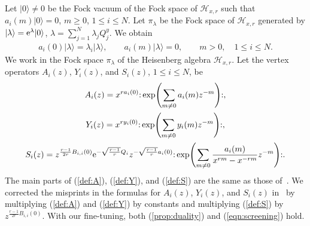\documentclass[pdftex]{sigma}
\numberwithin{equation}{section}
\begin{document}
Let $|0\rangle \neq 0$ be the Fock vacuum of the Fock space
of ${\mathcal H}_{x,r}$ such that $a_i(m)|0\rangle=0$, $m \geq 0$, $1\leq i \leq N$.
Let $\pi_\lambda$ be the Fock space of ${\mathcal H}_{x,r}$
generated by $|\lambda \rangle={\rm e}^{\lambda}|0\rangle$,
$\lambda=\sum_{j=1}^N\lambda_j Q_j^y$. We obtain
\begin{gather}
a_i(0)|\lambda\rangle=\lambda_i|\lambda\rangle,\qquad
a_i(m)|\lambda \rangle=0, \qquad
m>0,\quad 1\leq i \leq N.
\label{def:Fock}
\end{gather}
We work in the Fock space $\pi_\lambda$ of the Heisenberg algebra ${\mathcal H}_{x,r}$.
Let the vertex operators $A_i(z)$, $Y_i(z)$, and $S_i(z)$, $1\leq i \leq N$, be
\begin{gather}
A_i(z)=x^{r a_i(0)}{:}\exp\Biggl(\sum_{m \neq 0}a_i(m)z^{-m}\Biggr){:},
\label{def:A}
\\
Y_i(z)=x^{r y_i(0)}{:}\exp\Biggl(\sum_{m \neq 0}y_i(m)z^{-m}\Biggr){:},
\label{def:Y}
\\
S_i(z)=z^{\frac{r-1}{2r}B_{i,i}(0)}{\rm e}^{-\sqrt{\frac{r-1}{r}}Q_i}z^{-\sqrt{\frac{r-1}{r}}a_i(0)}
{:}\exp\Biggl(\sum_{m \neq 0}\frac{a_i(m)}{x^{rm}-x^{-rm}}z^{-m}\Biggr){:}.
\label{def:S}
\end{gather}
The main parts of (\ref{def:A}), (\ref{def:Y}), and (\ref{def:S})
are the same as those of~\cite{Frenkel-Reshetikhin1}.
We corrected the misprints in the formulas for $A_i(z)$, $Y_i(z)$, and $S_i(z)$ in~\cite{Frenkel-Reshetikhin1} by multiplying (\ref{def:A}) and (\ref{def:Y}) by constants and multiplying (\ref{def:S}) by $z^{\frac{r-1}{2r}B_{i,i}(0)}$.
With our fine-tuning, both (\ref{prop:duality}) and (\ref{eqn:screening}) hold.
\end{document}
